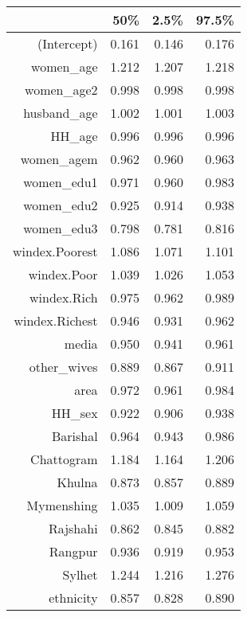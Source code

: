 \begin{table}[ht]
\centering
\begin{tabular}{rrrr}
  \hline
 & 50\% & 2.5\% & 97.5\% \\ 
  \hline
(Intercept) & 0.161 & 0.146 & 0.176 \\ 
  women\_age & 1.212 & 1.207 & 1.218 \\ 
  women\_age2 & 0.998 & 0.998 & 0.998 \\ 
  husband\_age & 1.002 & 1.001 & 1.003 \\ 
  HH\_age & 0.996 & 0.996 & 0.996 \\ 
  women\_agem & 0.962 & 0.960 & 0.963 \\ 
  women\_edu1 & 0.971 & 0.960 & 0.983 \\ 
  women\_edu2 & 0.925 & 0.914 & 0.938 \\ 
  women\_edu3 & 0.798 & 0.781 & 0.816 \\ 
  windex.Poorest & 1.086 & 1.071 & 1.101 \\ 
  windex.Poor & 1.039 & 1.026 & 1.053 \\ 
  windex.Rich & 0.975 & 0.962 & 0.989 \\ 
  windex.Richest & 0.946 & 0.931 & 0.962 \\ 
  media & 0.950 & 0.941 & 0.961 \\ 
  other\_wives & 0.889 & 0.867 & 0.911 \\ 
  area & 0.972 & 0.961 & 0.984 \\ 
  HH\_sex & 0.922 & 0.906 & 0.938 \\ 
  Barishal & 0.964 & 0.943 & 0.986 \\ 
  Chattogram & 1.184 & 1.164 & 1.206 \\ 
  Khulna & 0.873 & 0.857 & 0.889 \\ 
  Mymenshing & 1.035 & 1.009 & 1.059 \\ 
  Rajshahi & 0.862 & 0.845 & 0.882 \\ 
  Rangpur & 0.936 & 0.919 & 0.953 \\ 
  Sylhet & 1.244 & 1.216 & 1.276 \\ 
  ethnicity & 0.857 & 0.828 & 0.890 \\ 
   \hline
\end{tabular}
\end{table}
